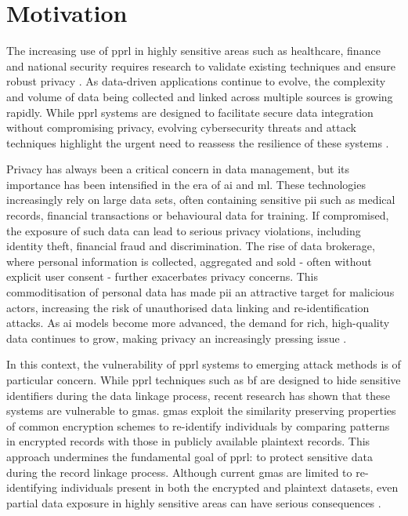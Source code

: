 \section{Motivation} \label{sec:motivation}

The increasing use of \ac{pprl} in highly sensitive areas such as healthcare, finance and national security requires research to validate existing techniques and ensure robust privacy \cite{schnell2009privacy}. 
As data-driven applications continue to evolve, the complexity and volume of data being collected and linked across multiple sources is growing rapidly. 
While \ac{pprl} systems are designed to facilitate secure data integration without compromising privacy, evolving cybersecurity threats and attack techniques highlight the urgent need to reassess the resilience of these systems \cite{vatsalan2017privacy}.

Privacy has always been a critical concern in data management, but its importance has been intensified in the era of \ac{ai} and \ac{ml}. 
These technologies increasingly rely on large data sets, often containing sensitive \ac{pii} such as medical records, financial transactions or behavioural data for training. If compromised, the exposure of such data can lead to serious privacy violations, including identity theft, financial fraud and discrimination. 
The rise of data brokerage, where personal information is collected, aggregated and sold - often without explicit user consent - further exacerbates privacy concerns. 
This commoditisation of personal data has made \ac{pii} an attractive target for malicious actors, increasing the risk of unauthorised data linking and re-identification attacks.
As \ac{ai} models become more advanced, the demand for rich, high-quality data continues to grow, making privacy an increasingly pressing issue \cite{king2024rethinking, manheim2019artificial}.

In this context, the vulnerability of \ac{pprl} systems to emerging attack methods is of particular concern. 
While \ac{pprl} techniques such as \ac{bf} are designed to hide sensitive identifiers during the data linkage process, recent research has shown that these systems are vulnerable to \ac{gma}s. 
\ac{gma}s exploit the similarity preserving properties of common encryption schemes to re-identify individuals by comparing patterns in encrypted records with those in publicly available plaintext records. 
This approach undermines the fundamental goal of \ac{pprl}: to protect sensitive data during the record linkage process. 
Although current \ac{gma}s are limited to re-identifying individuals present in both the encrypted and plaintext datasets, even partial data exposure in highly sensitive areas can have serious consequences \cite{schaefer2024,vidanage2020graph}.

